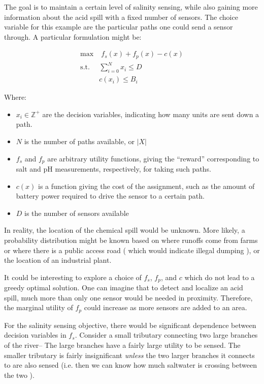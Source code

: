 \documentclass[letter,10pt]{article}
\begin{document}
The goal is to maintain a certain level of salinity sensing, while also gaining more information about the acid spill with a fixed number of sensors.  The choice variable for this example are the particular paths one could send a sensor through. A particular formulation might be:

\begin{align*}
\max & \; f_s(x) + f_p(x) - c(x)\\
\mbox{s.t.} & \sum_{i=0}^{N} x_i \leq D\\
& c(x_i) \leq B_i 
\end{align*}

Where:
\begin{itemize}
 \item $x_i \in \mathbb{Z}^+ $ are the decision variables, indicating how many units are sent down a path.
 \item $N$ is the number of paths available, or $\vert X\vert$
 \item $f_s$ and $f_p$ are arbitrary utility functions, giving the ``reward'' corresponding to salt and pH measurements, respectively, for taking such paths.
 \item $c(x)$ is a function giving the cost of the assignment, such as the amount of battery power required to drive the sensor to a certain path.
 \item $D$ is the number of sensors available
\end{itemize}

In reality, the location of the chemical spill would be unknown. More likely, a probability distribution might be known based on where runoffs come from farms or where there is a public access road ( which would indicate illegal dumping ), or the location of an industrial plant.  

It could be interesting to explore a choice of $f_s$, $f_p$, and $c$ which do not lead to a greedy optimal solution.  One can imagine that to detect and localize an acid spill, much more than only one sensor would be needed in proximity. Therefore, the marginal utility of $f_p$ could increase as more sensors are added to an area.

For the salinity sensing objective, there would be significant dependence between decision variables in $f_s$.  Consider a small tributary connecting two large branches of the river-- The large branches have a fairly large utility to be sensed. The smaller tributary is fairly insignificant \emph{unless} the two larger branches it connects to are also sensed (i.e. then we can know how much saltwater is crossing between the two ). 
\end{document}
